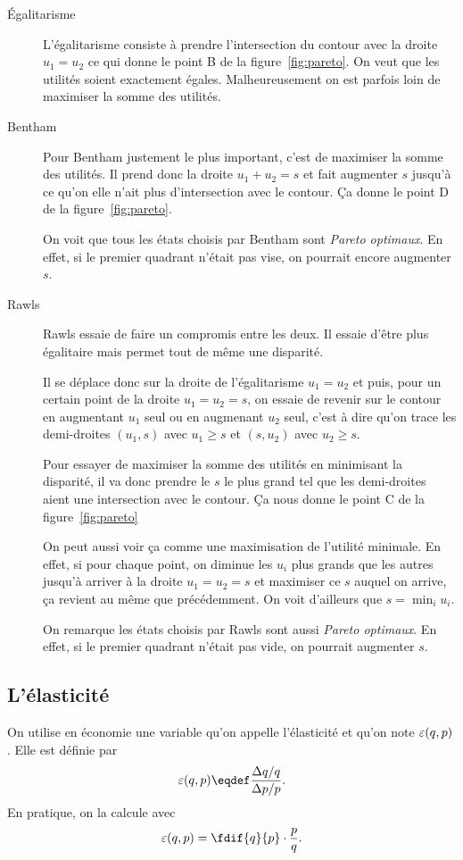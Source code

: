 \begin{description}
  \item[Égalitarisme]
    L'égalitarisme consiste à prendre l'intersection du contour
    avec la droite $u_1 = u_2$ ce qui donne le point B
    de la figure~\ref{fig:pareto}.
    On veut que les utilités soient exactement égales.
    Malheureusement on est parfois loin de maximiser la somme des
    utilités.
  \item[Bentham]
    Pour Bentham justement le plus important, c'est de maximiser la somme
    des utilités.
    Il prend donc la droite $u_1 + u_2 = s$ et fait augmenter $s$ jusqu'à
    ce qu'on elle n'ait plus d'intersection avec le contour.
    Ça donne le point D de la figure~\ref{fig:pareto}.

    On voit que tous les états choisis par Bentham sont
    \emph{Pareto optimaux}.
    En effet, si le premier quadrant n'était pas vise, on pourrait
    encore augmenter $s$.
  \item[Rawls]
    Rawls essaie de faire un compromis entre les deux.
    Il essaie d'être plus égalitaire mais permet tout de même une disparité.

    Il se déplace donc sur la droite de l'égalitarisme $u_1 = u_2$
    et puis, pour un certain point de la droite $u_1 = u_2 = s$,
    on essaie de revenir sur le contour en augmentant $u_1$ seul ou en
    augmenant $u_2$ seul, c'est à dire qu'on trace les demi-droites
    $(u_1,s)$ avec $u_1 \geq s$ et $(s,u_2)$ avec $u_2 \geq s$.

    Pour essayer de maximiser la somme des utilités en minimisant la
    disparité, il va donc prendre le $s$ le plus grand tel que les demi-droites
    aient une intersection avec le contour.
    Ça nous donne le point C de la figure~\ref{fig:pareto}

    On peut aussi voir ça comme une maximisation de l'utilité minimale.
    En effet, si pour chaque point, on diminue les $u_i$ plus grands
    que les autres jusqu'à arriver à la droite $u_1 = u_2 = s$ et maximiser
    ce $s$ auquel on arrive, ça revient au même que précédemment.
    On voit d'ailleurs que $s = \min_i u_i$.

    On remarque les états choisis par Rawls sont aussi
    \emph{Pareto optimaux}.
    En effet, si le premier quadrant n'était pas vide,
    on pourrait augmenter $s$.
\end{description}

\subsection{L'élasticité}
On utilise en économie une variable qu'on appelle l'élasticité et qu'on note
$\varepsilon(q,p)$. Elle est définie par
\begin{equation}
  \label{eq:elasticity}
  \elasticity(q,p) \eqdef \frac{\Delta q/q}{\Delta p/p}.
\end{equation}
En pratique, on la calcule avec
\[ \elasticity(q,p) = \fdif{q}{p}\cdot \frac{p}{q}. \]

